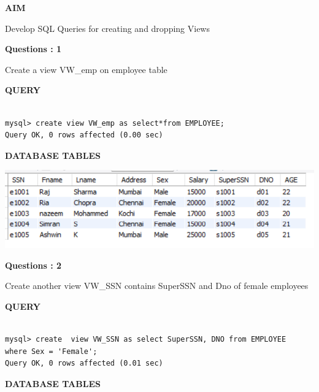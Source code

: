 \documentclass[a4paper,12pt]{report}
\begin{document}
	\begin{flushleft}
		\textbf{AIM }
	\end{flushleft} 
	   Develop SQL Queries for creating and dropping Views

\begin{flushleft}
    \textbf{Questions : 1}
\end{flushleft}
Create a view VW\_emp on employee table
	\begin{flushleft}
		\textbf{QUERY }
	\end{flushleft}
 \begin{verbatim}
 
mysql> create view VW_emp as select*from EMPLOYEE;
Query OK, 0 rows affected (0.00 sec)

\end{verbatim}
\begin{flushleft}
		\textbf{DATABASE TABLES} 
\end{flushleft} 

\includegraphics[scale=0.9]{VIEW1.png}
\begin{flushleft}
    \textbf{Questions : 2}
\end{flushleft}
Create another view VW\_SSN contains SuperSSN and Dno of female employees
	\begin{flushleft}
		\textbf{QUERY }
	\end{flushleft}
 \begin{verbatim}
 
mysql> create  view VW_SSN as select SuperSSN, DNO from EMPLOYEE 
where Sex = 'Female';
Query OK, 0 rows affected (0.01 sec)

\end{verbatim}
\begin{flushleft}
		\textbf{DATABASE TABLES} 
\end{flushleft} 
\end{document}
